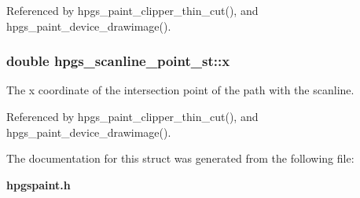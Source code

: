 Referenced by hpgs\_\-paint\_\-clipper\_\-thin\_\-cut(), and hpgs\_\-paint\_\-device\_\-drawimage().

\subsubsection[{x}]{\setlength{\rightskip}{0pt plus 5cm}double {\bf hpgs\_\-scanline\_\-point\_\-st::x}}\label{structhpgs__scanline__point__st_a573f70a9bc32ab4c5bf6cb3d32cc2ce3}
The x coordinate of the intersection point of the path with the scanline. 

Referenced by hpgs\_\-paint\_\-clipper\_\-thin\_\-cut(), and hpgs\_\-paint\_\-device\_\-drawimage().



The documentation for this struct was generated from the following file:\begin{DoxyCompactItemize}
\item 
{\bf hpgspaint.h}\end{DoxyCompactItemize}

